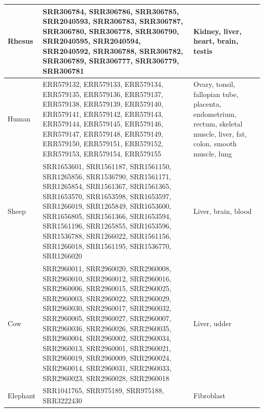 \documentclass[fleqn,10pt]{wlscirep}
\begin{document}
\begin{center}
\begin{longtable}{|p{}|p{}|p{}|}
Rhesus    & SRR306784, SRR306786, SRR306785, SRR2040593, SRR306783, SRR306787, SRR306780, SRR306778, SRR306790, SRR2040595, SRR2040594, SRR2040592, SRR306788, SRR306782, SRR306789, SRR306777, SRR306779, SRR306781                                                                                                                                                                                                                                       &    Kidney, liver, heart, brain, testis                                                                                                                    \\ \hline
Human     & ERR579132, ERR579133, ERR579134, ERR579135, ERR579136, ERR579137, ERR579138, ERR579139, ERR579140, ERR579141, ERR579142, ERR579143, ERR579144, ERR579145, ERR579146, ERR579147, ERR579148, ERR579149, ERR579150, ERR579151, ERR579152, ERR579153, ERR579154, ERR579155                                                                                                                                                                         & Ovary, tonsil, fallopian tube, placenta, endometrium, rectum, skeletal muscle, liver, fat, colon, smooth muscle, lung \\ \hline
Sheep     & SRR1653601, SRR1561187, SRR1561150, SRR1265856, SRR1536790, SRR1561171, SRR1265854, SRR1561367, SRR1561365, SRR1653570, SRR1653598, SRR1653597, SRR1266019, SRR1265849, SRR1653600, SRR1656805, SRR1561366, SRR1653594, SRR1561196, SRR1265855, SRR1653596, SRR1536788, SRR1266022, SRR1561156, SRR1266018, SRR1561195, SRR1536770, SRR1266020                                                                                                 &     Liver, brain, blood                                                                                                                   \\ \hline
Cow       & SRR2960011, SRR2960020, SRR2960008, SRR2960010, SRR2960012, SRR2960016, SRR2960006, SRR2960015, SRR2960025, SRR2960003, SRR2960022, SRR2960029, SRR2960030, SRR2960017, SRR2960032, SRR2960005, SRR2960027, SRR2960007, SRR2960036, SRR2960026, SRR2960035, SRR2960004, SRR2960002, SRR2960034, SRR2960013, SRR2960001, SRR2960021, SRR2960019, SRR2960009, SRR2960024, SRR2960014, SRR2960031, SRR2960033, SRR2960023, SRR2960028, SRR2960018 &   Liver, udder                                                                                                                    \\ \hline
Elephant  & SRR1041765, SRR975189, SRR975188, SRR3222430                                                                                                                                                                                                                                                                                                                                                                                                   &       Fibroblast                                                                                                                \\ \hline

\end{longtable}
\end{center}
\end{document}
